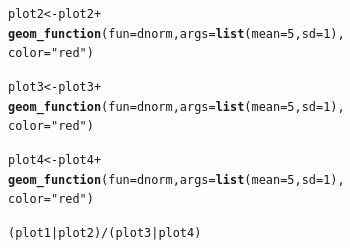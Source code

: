 \documentclass{article}\usepackage[]{graphicx}\usepackage[]{color}
\makeatletter
\newcommand{\hlnum}[1]{\textcolor[rgb]{0.686,0.059,0.569}{#1}}%
\newcommand{\hlstr}[1]{\textcolor[rgb]{0.192,0.494,0.8}{#1}}%
\newcommand{\hlopt}[1]{\textcolor[rgb]{0,0,0}{#1}}%
\newcommand{\hlstd}[1]{\textcolor[rgb]{0.345,0.345,0.345}{#1}}%
\newcommand{\hlkwb}[1]{\textcolor[rgb]{0.69,0.353,0.396}{#1}}%
\newcommand{\hlkwc}[1]{\textcolor[rgb]{0.333,0.667,0.333}{#1}}%
\newcommand{\hlkwd}[1]{\textcolor[rgb]{0.737,0.353,0.396}{\textbf{#1}}}%
\newenvironment{kframe}{%
 \def\at@end@of@kframe{}%
 \ifinner\ifhmode%
  \def\at@end@of@kframe{\end{minipage}}%
  \begin{minipage}{\columnwidth}%
 \fi\fi%
 \def\FrameCommand##1{\hskip\@totalleftmargin \hskip-\fboxsep
 \colorbox{shadecolor}{##1}\hskip-\fboxsep
     \hskip-\linewidth \hskip-\@totalleftmargin \hskip\columnwidth}%
 \MakeFramed {\advance\hsize-\width
   \@totalleftmargin\z@ \linewidth\hsize
   \@setminipage}}%
 {\par\unskip\endMakeFramed%
 \at@end@of@kframe}
\newenvironment{knitrout}{}{} %
\makeatother
\begin{document}
\begin{enumerate}
\begin{enumerate}
\begin{knitrout}
\begin{kframe}
\begin{alltt}
\hlstd{plot2} \hlkwb{<-} \hlstd{plot2}\hlopt{+}
  \hlkwd{geom_function}\hlstd{(}\hlkwc{fun}\hlstd{=dnorm,} \hlkwc{args}\hlstd{=}\hlkwd{list}\hlstd{(}\hlkwc{mean}\hlstd{=}\hlnum{5}\hlstd{,} \hlkwc{sd}\hlstd{=}\hlnum{1}\hlstd{),}
                \hlkwc{color}\hlstd{=}\hlstr{"red"}\hlstd{)}

\hlstd{plot3} \hlkwb{<-} \hlstd{plot3}\hlopt{+}
  \hlkwd{geom_function}\hlstd{(}\hlkwc{fun}\hlstd{=dnorm,} \hlkwc{args}\hlstd{=}\hlkwd{list}\hlstd{(}\hlkwc{mean}\hlstd{=}\hlnum{5}\hlstd{,} \hlkwc{sd}\hlstd{=}\hlnum{1}\hlstd{),}
                \hlkwc{color}\hlstd{=}\hlstr{"red"}\hlstd{)}

\hlstd{plot4} \hlkwb{<-} \hlstd{plot4}\hlopt{+}
  \hlkwd{geom_function}\hlstd{(}\hlkwc{fun}\hlstd{=dnorm,} \hlkwc{args}\hlstd{=}\hlkwd{list}\hlstd{(}\hlkwc{mean}\hlstd{=}\hlnum{5}\hlstd{,} \hlkwc{sd}\hlstd{=}\hlnum{1}\hlstd{),}
                \hlkwc{color}\hlstd{=}\hlstr{"red"}\hlstd{)}

\hlstd{(plot1}\hlopt{|}\hlstd{plot2)}\hlopt{/}\hlstd{(plot3}\hlopt{|}\hlstd{plot4)}
\end{alltt}


{\ttfamily\noindent\color{warningcolor}{\#\# Warning: Removed 700 row(s) containing missing values (geom\_path).}}

{\ttfamily\noindent\color{warningcolor}{\#\# Warning: Removed 700 row(s) containing missing values (geom\_path).}}

{\ttfamily\noindent\color{warningcolor}{\#\# Warning: Removed 700 row(s) containing missing values (geom\_path).}}


\end{kframe}
\end{knitrout}
\end{enumerate}
\end{enumerate}
\end{document}
